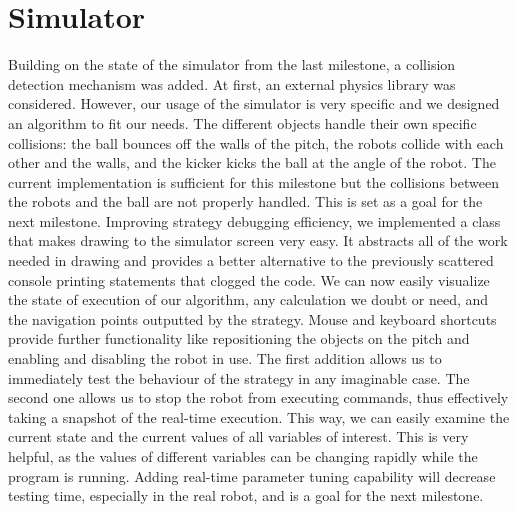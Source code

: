 \documentclass[conference,12pt]{IEEEtran}
\begin{document}
\section{Simulator}
\vspace{-2 mm}
Building on the state of the simulator from the last milestone, a collision detection mechanism was added. At first, an external physics library was considered. However, our usage of the simulator is very specific and we designed an algorithm to fit our needs. The different objects handle their own specific collisions: the ball bounces off the walls of the pitch, the robots collide with each other and the walls, and the kicker kicks the ball at the angle of the robot. The current implementation is sufficient for this milestone but the collisions between the robots and the ball are not properly handled. This is set as a goal for the next milestone.
Improving strategy debugging efficiency, we implemented a class that makes drawing to the simulator screen very easy. It abstracts all of the work needed in drawing and provides a better alternative to the previously scattered console printing statements that clogged the code. We can now easily visualize the state of execution of our algorithm, any calculation we doubt or need, and the navigation points outputted by the strategy.
Mouse and keyboard shortcuts provide further functionality like repositioning the objects on the pitch and enabling and disabling the robot in use. The first addition allows us to immediately test the behaviour of the strategy in any imaginable case. The second one allows us to stop the robot from executing commands, thus effectively taking a snapshot of the real-time execution. This way, we can easily examine the current state and the current values of all variables of interest. This is very helpful, as the values of different variables can be changing rapidly while the program is running. Adding real-time parameter tuning capability will decrease testing time, especially in the real robot, and is a goal for the next milestone. 
\end{document}
